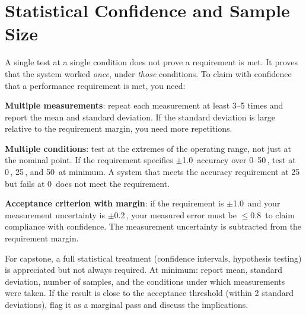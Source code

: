 \section{Statistical Confidence and Sample Size}
A single test at a single condition does not prove a requirement is met. It proves that the system worked \emph{once}, under \emph{those} conditions. To claim with confidence that a performance requirement is met, you need:

\textbf{Multiple measurements}: repeat each measurement at least 3--5 times and report the mean and standard deviation. If the standard deviation is large relative to the requirement margin, you need more repetitions.

\textbf{Multiple conditions}: test at the extremes of the operating range, not just at the nominal point. If the requirement specifies $\pm$1.0\,\degC{} accuracy over 0--50\,\degC{}, test at 0\,\degC{}, 25\,\degC{}, and 50\,\degC{} at minimum. A system that meets the accuracy requirement at 25\,\degC{} but fails at 0\,\degC{} does not meet the requirement.

\textbf{Acceptance criterion with margin}: if the requirement is $\pm$1.0\,\degC{} and your measurement uncertainty is $\pm$0.2\,\degC{}, your measured error must be $\leq$0.8\,\degC{} to claim compliance with confidence. The measurement uncertainty is subtracted from the requirement margin.

For capstone, a full statistical treatment (confidence intervals, hypothesis testing) is appreciated but not always required. At minimum: report mean, standard deviation, number of samples, and the conditions under which measurements were taken. If the result is close to the acceptance threshold (within 2 standard deviations), flag it as a marginal pass and discuss the implications.

